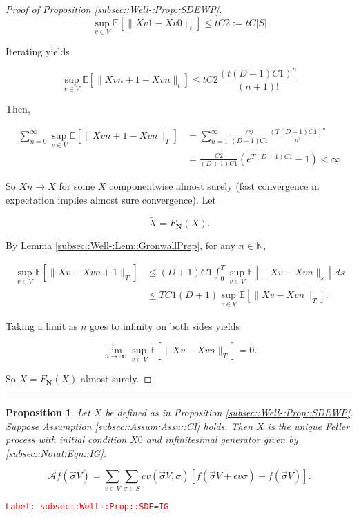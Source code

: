 \documentclass[12pt]{article}
\newcommand{\mb}{\mathbb}
\newcommand{\mc}{\mathcal}
\newcommand{\ra}{\rightarrow}
\newcommand{\ep}{\epsilon}
\newcommand{\tr}{\textcolor{red}}
\newcommand{\labe}[1]{\tr{\texttt{Label: #1}}}
\newcommand{\lin}{\rule{\linewidth}{0.4 pt}}
\newcommand{\ex}[1]{\mb{E}\left[#1\right]}			%
\newcommand{\defeq}{:=}								%
\renewcommand{\v}{v}							%
\renewcommand{\S}{S}							%
\newcommand{\s}{\sigma}							%
\newcommand{\sv}{\vec{\s}}						%
\newcommand{\ev}{\ep}							%
\newcommand{\T}{T}								%
\renewcommand{\t}{t}							%
\renewcommand{\tt}{s}							%
\newcommand{\X}{X}								%
\newcommand{\IG}{\mc{A}}						%
\newcommand{\IGr}{c}							%
\newcommand{\const}{C}							%
\newcommand{\degr}{D}							%
\newcommand{\poisses}{\mathbf{N}}				%
\newcommand{\Fpo}{F_{\poisses}}					%
\newcommand{\alt}[1]{\widetilde{#1}}			%
\newtheorem{prop}[thms]{Proposition}
\begin{document}
\begin{proof}[Proof of Proposition \ref{subsec::Well-:Prop::SDEWP}]
\[\sup_{\v \in V}\ex{\|\X{\v}{}{1} - \X{\v}{}{0}\|_\t} \leq \t\const{2} \defeq \t\const{}|\S|\]

Iterating yields

\[\sup_{\v \in V} \ex{\|\X{\v}{}{n+1} - \X{\v}{}{n}\|_\t} \leq \t\const{2}\frac{(\t(\degr+1)\const{1})^n}{(n+1)!}\]

Then,

\begin{align*}
\sum_{n=0}^\infty \sup_{\v \in V} \ex{\|\X{\v}{}{n+1} - \X{\v}{}{n}\|_\T} &= \sum_{n=1}^\infty \frac{\const{2}}{(\degr+1)\const{1}}\frac{(\T(\degr+1)\const{1})^{n}}{n !}\\
& = \frac{\const{2}}{(\degr+1)\const{1}}(e^{\T(\degr+1)\const{1}} - 1) < \infty
\end{align*}


So \(\X{}{}{n} \ra \X{}{}\) for some \(\X{}{}\) componentwise almost surely (fast convergence in expectation implies almost sure convergence). Let 

\[\alt{\X}{}{} = \Fpo(\X{}{}).\]

By Lemma \ref{subsec::Well-:Lem::GronwallPrep}, for any \(n\in\mb{N}\),

\begin{align*}
\sup_{\v \in V} \ex{\|\alt{\X}{\v}{} - \X{\v}{}{n+1}\|_\T} &\leq (\degr+1)\const{1}\int_0^\T \sup_{\v \in V}\ex{\|\X{\v}{} - \X{\v}{}{n}\|_\tt}\,d\tt \\
&\leq \T\const{1}(\degr+1)\sup_{\v\in V} \ex{\|\X{\v}{} - \X{\v}{}{n}\|_\T}.
\end{align*}

Taking a limit as \(n\) goes to infinity on both sides yields

\[\lim_{n\ra\infty} \sup_{\v \in V} \ex{\|\alt{\X}{\v}{} - \X{\v}{}{n}\|_\T} = 0.\]

So \(\X{}{}= \Fpo(\X{}{})\) almost surely.
\end{proof}

\lin

\begin{prop}
Let \(\X{}{}\) be defined as in Proposition \ref{subsec::Well-:Prop::SDEWP}. Suppose Assumption \ref{subsec::Assum:Assu::CI} holds. Then \(\X{}{}\) is the unique Feller process with initial condition \(\X{}{0}\) and infinitesimal generator given by \eqref{subsec::Notat:Eqn::IG}:

\[\IG f(\sv{}{V}) = \sum_{\v\in V}\sum_{\s \in \S} \IGr{\v}(\sv{}{V},\s)[f(\sv{}{V} + \ev{\v}\s) - f(\sv{}{V})].\]
\label{subsec::Well-:Prop::SDE=IG}
\end{prop}
\labe{subsec::Well-:Prop::SDE=IG}
\end{document}

